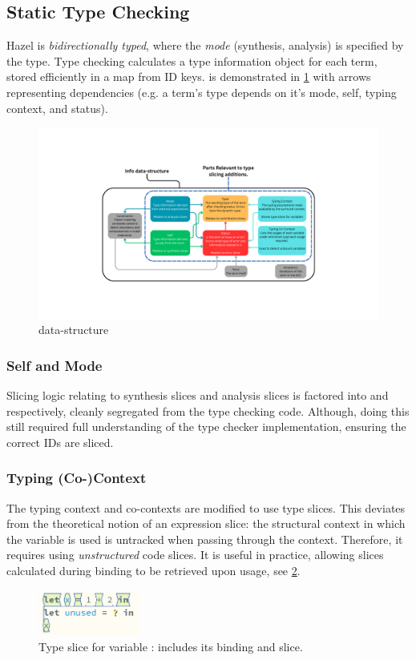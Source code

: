 \subsection{Static Type Checking}\label{sec:TypeChecking}
Hazel is \textit{bidirectionally typed}, where the \textit{mode} (synthesis, analysis) is specified by the  type. Type checking calculates a type information object  for each term, stored efficiently in a map from ID keys.  is demonstrated in \cref{fig:Info} with arrows representing dependencies (e.g. a term's type depends on it's mode, self, typing context, and status).
\begin{figure}[h]
\includegraphics[width=1\textwidth, trim={8cm 5cm 8cm 5cm}, clip]{Media/Figures/info}
\caption{ data-structure}
\label{fig:Info}
\end{figure}

\subsubsection{Self and Mode}
Slicing logic relating to synthesis slices and analysis slices is factored into  and  respectively, cleanly segregated from the type checking code. Although, doing this still required full understanding of the type checker implementation, ensuring the correct IDs are sliced.

\subsubsection{Typing (Co-)Context}
The typing context and co-contexts are modified to use type slices. This deviates from the theoretical notion of an expression slice: the structural context in which the variable is used is untracked when passing through the context. Therefore, it requires using \textit{unstructured} code slices. It is useful in practice, allowing slices calculated during binding to be retrieved upon usage, see \cref{fig:VarSlice}.
\begin{figure}[h]
\centering
\includegraphics[width=0.3\textwidth]{Media/Figures/var_slice}
\caption{Type slice for variable : includes its binding and slice.}
\label{fig:VarSlice}
\end{figure}

